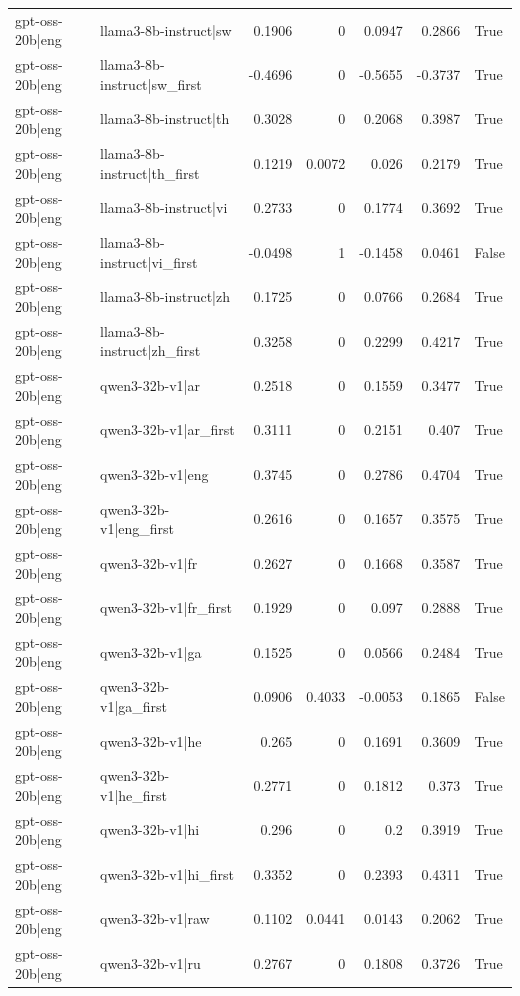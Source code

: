 \begin{table}
\begin{tabular}{l l r r r r l}
gpt-oss-20b|eng & llama3-8b-instruct|sw & 0.1906 & 0 & 0.0947 & 0.2866 & True \\
gpt-oss-20b|eng & llama3-8b-instruct|sw_first & -0.4696 & 0 & -0.5655 & -0.3737 & True \\
gpt-oss-20b|eng & llama3-8b-instruct|th & 0.3028 & 0 & 0.2068 & 0.3987 & True \\
gpt-oss-20b|eng & llama3-8b-instruct|th_first & 0.1219 & 0.0072 & 0.026 & 0.2179 & True \\
gpt-oss-20b|eng & llama3-8b-instruct|vi & 0.2733 & 0 & 0.1774 & 0.3692 & True \\
gpt-oss-20b|eng & llama3-8b-instruct|vi_first & -0.0498 & 1 & -0.1458 & 0.0461 & False \\
gpt-oss-20b|eng & llama3-8b-instruct|zh & 0.1725 & 0 & 0.0766 & 0.2684 & True \\
gpt-oss-20b|eng & llama3-8b-instruct|zh_first & 0.3258 & 0 & 0.2299 & 0.4217 & True \\
gpt-oss-20b|eng & qwen3-32b-v1|ar & 0.2518 & 0 & 0.1559 & 0.3477 & True \\
gpt-oss-20b|eng & qwen3-32b-v1|ar_first & 0.3111 & 0 & 0.2151 & 0.407 & True \\
gpt-oss-20b|eng & qwen3-32b-v1|eng & 0.3745 & 0 & 0.2786 & 0.4704 & True \\
gpt-oss-20b|eng & qwen3-32b-v1|eng_first & 0.2616 & 0 & 0.1657 & 0.3575 & True \\
gpt-oss-20b|eng & qwen3-32b-v1|fr & 0.2627 & 0 & 0.1668 & 0.3587 & True \\
gpt-oss-20b|eng & qwen3-32b-v1|fr_first & 0.1929 & 0 & 0.097 & 0.2888 & True \\
gpt-oss-20b|eng & qwen3-32b-v1|ga & 0.1525 & 0 & 0.0566 & 0.2484 & True \\
gpt-oss-20b|eng & qwen3-32b-v1|ga_first & 0.0906 & 0.4033 & -0.0053 & 0.1865 & False \\
gpt-oss-20b|eng & qwen3-32b-v1|he & 0.265 & 0 & 0.1691 & 0.3609 & True \\
gpt-oss-20b|eng & qwen3-32b-v1|he_first & 0.2771 & 0 & 0.1812 & 0.373 & True \\
gpt-oss-20b|eng & qwen3-32b-v1|hi & 0.296 & 0 & 0.2 & 0.3919 & True \\
gpt-oss-20b|eng & qwen3-32b-v1|hi_first & 0.3352 & 0 & 0.2393 & 0.4311 & True \\
gpt-oss-20b|eng & qwen3-32b-v1|raw & 0.1102 & 0.0441 & 0.0143 & 0.2062 & True \\
gpt-oss-20b|eng & qwen3-32b-v1|ru & 0.2767 & 0 & 0.1808 & 0.3726 & True \\

\end{tabular}
\end{table}

